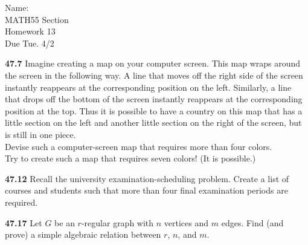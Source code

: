 \documentclass[10pt]{article}
\begin{document}
\begin{flushright}
	Name: \underline{\hspace{3cm}} \\
	MATH55 Section \underline{\hspace{0.5cm}} \\
	Homework 13 \\
	Due Tue. 4/2
\end{flushright}


\begin{framed}
	\textbf{47.7} Imagine creating a map on your computer screen. 
	This map wraps around the screen in the following way. A line that moves off the right side 
	of the screen instantly reappears at the corresponding position on the left. 
	Similarly, a line that drops off the bottom of the screen instantly reappears at the 
	corresponding position at the top. Thus it is possible to have a country on this map 
	that has a little section on the left and another little section on the right of the screen, 
	but is still in one piece.\\

	\noindent Devise such a computer-screen map that requires more than four colors.\\
	Try to create such a map that requires seven colors! (It is possible.)
\end{framed}

\pagebreak

\begin{framed}
	\textbf{47.12} Recall the university examination-scheduling problem.
	Create a list of courses and students such that more than four final 
	examination periods are required.
\end{framed}

\pagebreak

\begin{framed}
	\textbf{47.17} Let $G$ be an $r$-regular graph with $n$ vertices and $m$ edges. Find (and prove) a simple
	algebraic relation between $r$, $n$, and $m$.
\end{framed}

\pagebreak
\end{document}
